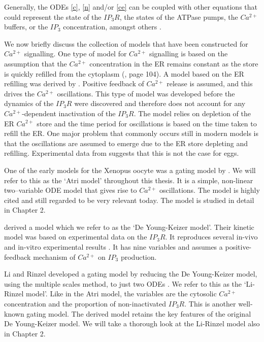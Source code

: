 {Generally,  the ODEs \eqref{c}, \eqref{n} and/or \eqref{ce} can be coupled with other equations that could represent the state of the $IP_3R$, the states of the ATPase pumps, the $Ca^{2+}$ buffers, or the $IP_3$ concentration, amongst others .

We now briefly discuss the collection of models that have been constructed for $Ca^{2+}$ signalling. One type of model for $Ca^{2+}$ signalling is based on the assumption that the $Ca^{2+}$ concentration in the ER remains constant as the store is quickly refilled from the {cytoplasm} (, page 104). {A model based on the ER refilling} was derived by . Positive feedback of $Ca^{2+}$ release is assumed, and this drives the $Ca^{2+}$ oscillations. This type of model was developed before the dynamics of the $IP_3R$ were discovered and therefore does not account for any $Ca^{2+}$-dependent inactivation of the $IP_3R$. The model relies on depletion of the ER $Ca^{2+}$ store and the time period for oscillations is based on the time taken to refill the ER. One major problem that commonly occurs still in modern models is that the oscillations are assumed to emerge due to the ER store depleting and refilling. {Experimental data from  suggests that this is not the case for eggs.}

{One of the early models} for the Xenopus oocyte was a gating model by . We will refer to this as the `Atri model' throughout this thesis. It is a simple, non-linear two--variable ODE model that gives rise to $Ca^{2+}$ oscillations. The model is highly cited and still regarded to be very relevant today. The model is studied in detail in Chapter 2. 

 {derived a model} which we refer to as the `De Young-Keizer model'. Their kinetic model was based on experimental data on the $IP_3R$. It reproduces several in-vivo and in-vitro experimental results . It has nine variables and assumes a positive-feedback mechanism of $Ca^{2+}$ on $IP_3$ production.

Li and Rinzel developed a gating model by reducing the De Young-Keizer model, using the multiple scales method, to just two ODEs \cite{lirinzel}. We refer to this as the `Li-Rinzel model'. Like in the Atri model, the variables are the cytosolic $Ca^{2+}$ concentration and the proportion of non-inactivated $IP_3R$. This is another well-known gating model. The derived model retains the key features of the original De Young-Keizer model. We will take a thorough look at the Li-Rinzel model also in Chapter 2. 

}
